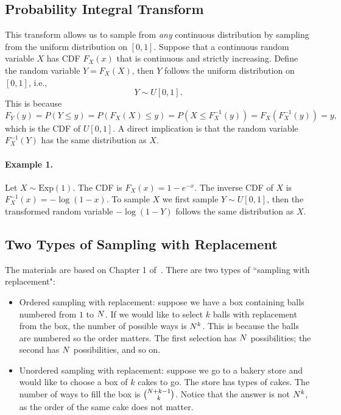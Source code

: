 

\subsection{Probability Integral Transform}
    This transform allows us to sample from \emph{any} continuous distribution by sampling from the uniform distribution on $[0, 1]$.
    Suppose that a continuous random variable $X$ has CDF $F_X(x)$ that is continuous and strictly increasing. 
    Define the random variable $Y=F_X(X)$, then $Y$ follows the uniform distribution on $[0, 1]$, i.e., 
        \begin{equation}
            Y \sim U[0, 1].
        \end{equation}
    This is because 
        \begin{equation}
            F_Y(y) = P(Y \le y) = P(F_X(X) \le y) = P(X \le F^{-1}_X(y)) = F_X\left(F^{-1}_X(y) \right) = y,
        \end{equation}
    which is the CDF of $U[0, 1]$.
    A direct implication is that the random variable $F^{-1}_X(Y)$ has the same distribution as $X$.
    
    \paragraph{Example 1.}
        Let $X \sim \text{Exp}(1)$. The CDF is $F_X(x) = 1 - e^{-x}$. The inverse CDF of $X$ is $F^{-1}_X(x) = -\log(1-x)$.
        To sample $X$  we  first sample $Y \sim U[0, 1]$, then the transformed random variable $-\log(1-Y)$ follows the same distribution as $X$.

\subsection{Two Types of Sampling with Replacement}
The materials are based on Chapter 1 of~\cite{degroot2012probability}.
There are two types of ``sampling with replacement":
\begin{itemize}
    \item Ordered sampling with replacement: suppose we have a box containing \ndata balls numbered from $1$ to $N$.
    If we would like to select $k$ balls with replacement from the box, the number of possible ways is $N^k$.
    This is because the balls are numbered so the order matters. The first selection has $N$ possibilities; the second has $N$ possibilities, and so on.
    
    \item Unordered sampling with replacement: suppose we go to a bakery store and would like to choose a box of $k$ cakes to go.
    The store has \ndata types of cakes.
    The number of ways to fill the box is $\binom{N+k-1}{k}$.
    Notice that the answer is not $N^k$, as the order of the same cake does not matter.
\end{itemize}